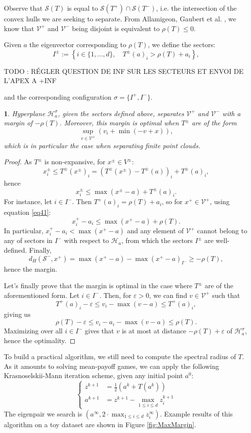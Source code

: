 \documentclass[oneside,english,a4paper]{amsart}
\numberwithin{equation}{section}
\numberwithin{figure}{section}
\theoremstyle{plain}
\theoremstyle{definition}
\theoremstyle{plain}
\newtheorem{prop}[thm]{\protect\propositionname}
\theoremstyle{remark}
\theoremstyle{plain}
\theoremstyle{definition}
\theoremstyle{definition}
\providecommand{\propositionname}{Proposition}
\begin{document}
Observe that $\mathcal{S}(T)$ is equal to $\mathcal{S}(T^{+})\cap\mathcal{S}(T^{-})$,
i.e. the intersection of the convex hulls we are seeking to separate.
From Allamigeon, Gaubert et al. \cite{Allamigeon2018}, we know that $\mathcal{V}^{+}$
and $\mathcal{V^{-}}$ being disjoint is equivalent to $\rho(T)\le0$.

Given $a$ the eigenvector corresponding to $\rho(T)$, we define the sectors:
\[
I^{\pm}:=\left\{i\in\{1,\ldots, d\},\quad T^{\pm}(a)_{i}>\rho(T)+a_{i}\right\},
\]

TODO : RÉGLER QUESTION DE INF SUR LES SECTEURS ET ENVOI DE L'APEX A +INF

and the corresponding configuration $\sigma=\{I^{+},I^{-}\}$.
\begin{prop}
Hyperplane $\mathcal{H}_{a}^{\sigma}$, given the sectors defined
above, separates $\mathcal{V}^{+}$ and $\mathcal{V}^{-}$ with a
margin of $-\rho(T)$. Moreover, this margin is optimal when $T^{\pm}$
are of the form
\[
\sup_{v\in\mathcal{V}^{\pm}}\left(v_{i}+\min(-v+x)\right),
\]
which is in particular the case when separating finite point clouds.
\end{prop}

\begin{proof}
As $T^{\pm}$ is non-expansive, for $x^{\pm}\in V^{\pm}$:
\[
x_{i}^{\pm}\le T^{\pm}(x^{\pm})_{i}=\left(T^{\pm}(x^{\pm})-T^{\pm}(a)\right)_{i}+T^{\pm}(a)_{i},
\]
hence 
\begin{equation}
x_{i}^{\pm}\le\max(x^{\pm}-a)+T^{\pm}(a)_{i}.\label{eq41}
\end{equation}
For instance, let $i\in I^{-}$. Then $T^{+}(a)_{i}=\rho(T)+a_{i}$,
so for $x^{+}\in \mathcal{V}^{+}$, using equation \ref{eq41}:
\[
x_{i}^{+}-a_{i}\le\max(x^{+}-a)+\rho(T).
\]
In particular, $x_{i}^{+}-a_{i}<\max(x^{+}-a)$ and any element of
$\mathcal{V}^{+}$ cannot belong to any of sectors in $I^{-}$ with
respect to $\mathcal{H}_{a}$, from which the sectors $I^{\pm}$ are well-defined.
Finally, 
\[
d_H(\mathcal{S}^-,x^{+})=\max(x^{+}-a)-\max(x^{+}-a)_{I^{-}}\ge-\rho(T),
\]
hence the margin.

Let's finally prove that the margin is optimal in the case where $T^{\pm}$
are of the aforementioned form.
Let $i\in I^{-}$. Then, for $\varepsilon>0$, we can
find $v\in \mathcal{V}^{+}$ such that 
\[
T^{+}(a)_{i}-\varepsilon\le v_{i}-\max(v-a)\le T^{+}(a)_{i},
\]
giving us 
\[
\rho(T)-\varepsilon\le v_{i}-a_{i}-\max(v-a)\le\rho(T).
\]
Maximizing over all $i\in I^{-}$ gives that $v$ is
at most at distance $-\rho(T)+\varepsilon$ of $\mathcal{H}_{a}^{\sigma}$, hence
the optimality.
\end{proof}
%
To build a practical algorithm, we still need to compute the spectral
radius of $T$. As it amounts to solving mean-payoff games, we can apply the following Krasnoselskii-Mann iteration scheme,
given any initial point $a^{0}$:
\[
\begin{cases}
z^{k+1} & =\frac{1}{2}\left(a^{k}+T(a^{k})\right)\\
a^{k+1} & =z^{k+1}-\max_{1\le i\le d}z_{i}^{k+1}
\end{cases}
\]
The eigenpair we search is $(a^{\infty},2\cdot\max_{1\le i\le d}z_{i}^{\infty})$.
Example results of this algorithm on a toy dataset are shown in Figure
\ref{fig:MaxMargin}.
\end{document}
